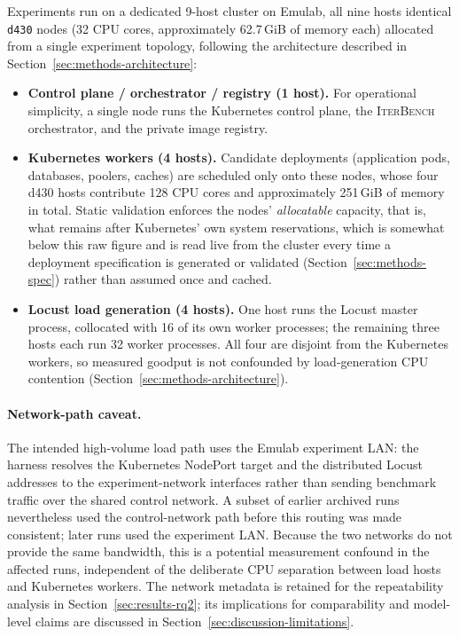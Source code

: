 Experiments run on a dedicated 9-host cluster on Emulab, all nine hosts
identical \texttt{d430} nodes (32 CPU cores, approximately 62.7\,GiB of
memory each) allocated from a single experiment topology, following the
architecture described in Section~\ref{sec:methods-architecture}:

\begin{itemize}
  \item \textbf{Control plane / orchestrator / registry (1 host).} For
        operational simplicity, a single node runs the Kubernetes control
        plane, the \textsc{IterBench} orchestrator, and the private image
        registry.
  \item \textbf{Kubernetes workers (4 hosts).} Candidate deployments
        (application pods, databases, poolers, caches) are scheduled only
        onto these nodes, whose four d430 hosts contribute 128 CPU cores
        and approximately 251\,GiB of memory in total. Static validation
        enforces the nodes' \emph{allocatable} capacity, that is, what
        remains after Kubernetes' own system reservations, which is somewhat
        below this raw figure and is read live from the cluster every time a
        deployment specification is generated or validated
        (Section~\ref{sec:methods-spec}) rather than assumed once and cached.
  \item \textbf{Locust load generation (4 hosts).} One host runs the Locust
        master process, collocated with 16 of its own worker processes; the
        remaining three hosts each run 32 worker processes. All four are
        disjoint from the Kubernetes workers, so measured goodput is not
        confounded by load-generation CPU contention
        (Section~\ref{sec:methods-architecture}).
\end{itemize}

\paragraph{Network-path caveat.} The intended high-volume load path uses the
Emulab experiment LAN: the harness resolves the Kubernetes NodePort target
and the distributed Locust addresses to the experiment-network interfaces
rather than sending benchmark traffic over the shared control network. A
subset of earlier archived runs nevertheless used the control-network path
before this routing was made consistent; later runs used the experiment LAN.
Because the two networks do not provide the same bandwidth, this is a
potential measurement confound in the affected runs, independent of the
deliberate CPU separation between load hosts and Kubernetes workers. The
network metadata is retained for the repeatability analysis in
Section~\ref{sec:results-rq2}; its implications for comparability and model-
level claims are discussed in Section~\ref{sec:discussion-limitations}.


